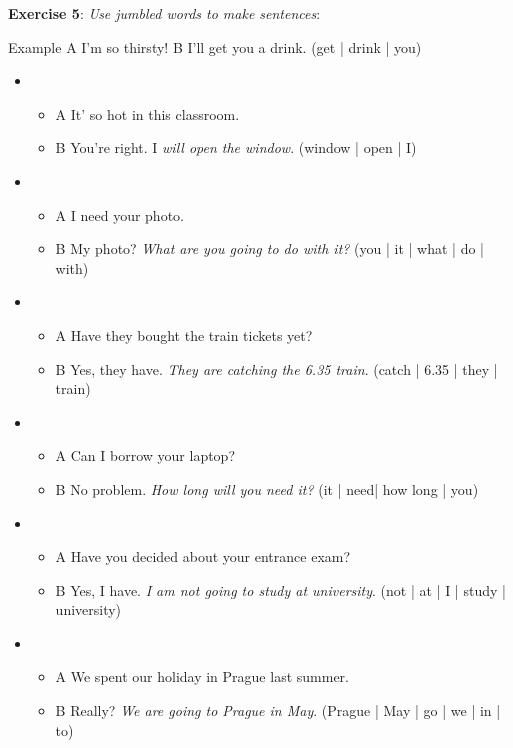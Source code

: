 \textbf{Exercise 5}: \textit{Use jumbled words to make sentences}:

Example
A I'm so thirsty!
B I'll get you a drink. (get | drink | you)

\begin{itemize}

\item
\begin{itemize}
\item A It' so hot in this classroom.
\item B You're right. I \textit{will open the window}. (window | open | I)
\end{itemize}

\item
\begin{itemize}
\item A I need your photo.
\item B My photo? \textit{What are you going to do with it?} (you | it | what | do | with)
\end{itemize}

\item
\begin{itemize}
\item A Have they bought the train tickets yet?
\item B Yes, they have. \textit{They are catching the 6.35 train}. (catch | 6.35 | they | train)
\end{itemize}

\item
\begin{itemize}
\item A Can I borrow your laptop?
\item B No problem. \textit{How long will you need it?} (it | need| how long | you)
\end{itemize}

\item
\begin{itemize}
\item A Have you decided about your entrance exam?
\item B Yes, I have. \textit{I am not going to study at university}. (not | at | I | study | university)
\end{itemize}

\item
\begin{itemize}
\item A We spent our holiday in Prague last summer.
\item B Really? \textit{We are going to Prague in May}. (Prague | May | go | we | in | to)
\end{itemize}


\end{itemize}
